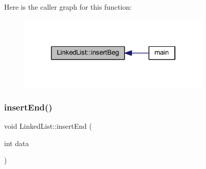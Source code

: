 Here is the caller graph for this function\+:
\nopagebreak
\begin{figure}[H]
\begin{center}
\leavevmode
\includegraphics[width=262pt]{class_linked_list_a583e4bb42bb128feddb57767863fd28e_icgraph}
\end{center}
\end{figure}
\mbox{\label{class_linked_list_a8b87744316967b16f272be10cd6718ed}} 
\subsubsection{\texorpdfstring{insert\+End()}{insertEnd()}}
{\footnotesize\ttfamily void Linked\+List\+::insert\+End (\begin{DoxyParamCaption}\item[{int}]{data }\end{DoxyParamCaption})}

